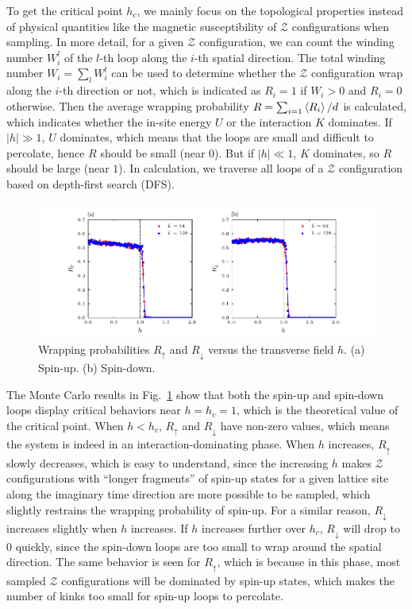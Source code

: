 \documentclass{article}
\theoremstyle{plain} \newtheorem{thm}{Theorem}[section]
\theoremstyle{definition} \newtheorem{df}{Definition}[section]
\theoremstyle{definition} \newtheorem{eg}{Example}
\theoremstyle{remark} \newtheorem*{rmk}{Remark}
\begin{document}
To get the critical point $h_c$, we mainly focus on the topological properties instead of physical quantities like the magnetic susceptibility of $\mathcal{Z}$ configurations when sampling. In more detail, for a given $\mathcal{Z}$ configuration, we can count the winding number $W_i^l$ of the $l$-th loop along the $i$-th spatial direction. The total winding number $W_i = \sum_{l}W_i^l$ can be used to determine whether the $\mathcal{Z}$ configuration wrap along the $i$-th direction or not, which is indicated as $R_i = 1$ if $W_i > 0$ and $R_i = 0$ otherwise. Then the average wrapping probability $R = \sum_{i=1}\braket{R_i}/d$ is calculated, which indicates whether the in-site energy $U$ or the interaction $K$ dominates. If $|h| \gg 1$, $U$ dominates, which means that the loops are small and difficult to percolate, hence $R$ should be small (near $0$). But if $|h| \ll 1$, $K$ dominates, so $R$ should be large (near $1$). In calculation, we traverse all loops of a $\mathcal{Z}$ configuration based on depth-first search (DFS).

\begin{figure}[htpb]
  \centering
  \includegraphics[width=\textwidth]{figs/wrapping_probability.pdf}
  \caption{Wrapping probabilities $R_\uparrow$ and $R_\downarrow$ versus the transverse field $h$. (a) Spin-up. (b) Spin-down.}
  \label{fig:wrapping_probability}
\end{figure}

The Monte Carlo results in Fig.~\ref{fig:wrapping_probability} show that both the spin-up and spin-down loops display critical behaviors near $h = h_c = 1$, which is the theoretical value of the critical point. When $h < h_c$, $R_\uparrow$ and $R_\downarrow$ have non-zero values, which means the system is indeed in an interaction-dominating phase. When $h$ increases, $R_\uparrow$ slowly decreases, which is easy to understand, since the increasing $h$ makes $\mathcal{Z}$ configurations with ``longer fragments'' of spin-up states for a given lattice site along the imaginary time direction are more possible to be sampled, which slightly restrains the wrapping probability of spin-up. For a similar reason, $R_\downarrow$ increases slightly when $h$ increases. If $h$ increases further over $h_c$, $R_\downarrow$ will drop to $0$ quickly, since the spin-down loops are too small to wrap around the spatial direction. The same behavior is seen for $R_\uparrow$, which is because in this phase, most sampled $\mathcal{Z}$ configurations will be dominated by spin-up states, which makes the number of kinks too small for spin-up loops to percolate.
\end{document}
